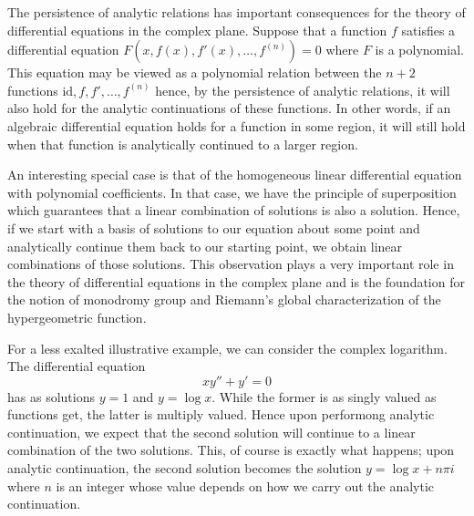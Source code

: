 \documentclass[12pt]{article}
\begin{document}
The persistence of analytic relations has important consequences 
for the theory of differential equations in the complex plane.
Suppose that a function $f$ satisfies a differential equation
$F(x,f(x), f'(x), \ldots, f^{(n)}) = 0$ where $F$ is a polynomial.  
This equation may be viewed as a polynomial relation between the 
$n+2$ functions $\mathrm{id},f, f', \ldots, f^{(n)}$ hence, by the 
persistence of analytic relations, it will also hold for the analytic
continuations of these functions.  In other words, if an
algebraic differential equation holds for a function in some
region, it will still hold when that function is analytically 
continued to a larger region.

An interesting special case is that of the homogeneous linear 
differential equation with polynomial coefficients.  In that
case, we have the principle of superposition which guarantees 
that a linear combination of solutions is also a solution. 
Hence, if we start with a basis of solutions to our equation 
about some point and analytically continue them back to our 
starting point, we obtain linear combinations of those 
solutions.  This observation plays a very important role in the
theory of differential equations in the complex plane and is
the foundation for the notion of monodromy group and Riemann's 
global characterization of the hypergeometric function.  

For a less exalted illustrative example, we can consider the
complex logarithm.  The differential equation
 \[x y'' + y' = 0\]
has as solutions $y = 1$ and $y = \log x$.  While the former 
is as singly valued as functions get, the latter is multiply
valued.  Hence upon performong analytic continuation, we expect
that the second solution will continue to a linear combination
of the two solutions.  This, of course is exactly what happens;
upon analytic continuation, the second solution becomes the
solution $y = \log x + n \pi i$ where $n$ is an integer whose
value depends on how we carry out the analytic continuation. 
\end{document}
